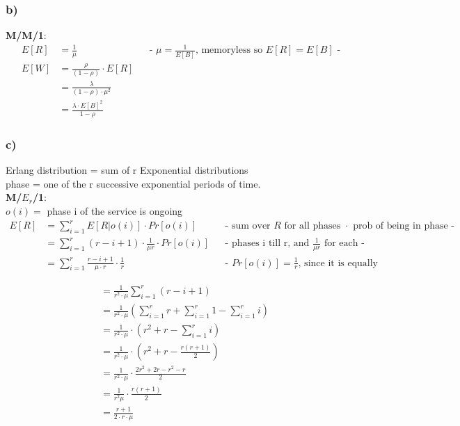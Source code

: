 \subsubsection*{ b) }

\textbf{M/M/1}:
\begin{align*}
E\left[R\right]&=\frac{1}{\mu }&& \text{-  $\mu = \frac{1}{E[B]}$, memoryless so $E\left[R\right]=E\left[B\right]$ -}\\
E\left[W\right]&=\frac{\rho }{\left(1-\rho \right)} \cdot E[R]\\
&= \frac{\lambda }{\left(1-\rho \right) \cdot \mu^2}\\
&=\frac{\lambda \cdot E\left[B\right]^{2}}{1-\rho }
\end{align*}

\subsubsection*{ c) }
Erlang distribution = sum of r Exponential distributions\\
phase = one of the r successive exponential periods of time.\\
\textbf{M/$E_r$/1}:\\
$o\left(i\right)=$ phase i of the service is ongoing
\begin{align*}
E\left[R\right]&=\sum _{{i=1}}^{r}E\left[R|o\left(i\right)\right]\cdot Pr\left[o\left(i\right)\right] &&
\text{- sum over $R$ for all phases $\cdot$ prob of being in phase -}\\
&=\sum _{{i=1}}^{r} (r-i+1) \cdot \frac{1}{\mu r} \cdot Pr\left[o\left(i\right)\right] &&
\text{- phases i till r, and $\frac{1}{\mu r}$ for each -}\\
&=\sum _{{i=1}}^{r}\frac{r-i+1}{\mu \cdot r}\cdot \frac{1}{r} &&
\text{- $Pr\left[o\left(i\right)\right]=\frac{1}{r}$, since it is equally distributed -}
\end{align*}

\begin{align*}
&=\frac{1}{r^{2}\cdot \mu }\sum _{i=1}^{r}\left(r-i+1\right)\\
&=\frac{1}{r^{2}\cdot \mu }\left(\sum_{i=1}^{r} r + \sum_{i=1}^{r} 1 - \sum_{i=1}^{r} i\right)\\
&=\frac{1}{r^{2}\cdot \mu }\cdot \left(r^{2}+r-\sum _{{i=1}}^{r}i\right)\\
&=\frac{1}{r^{2}\cdot \mu }\cdot \left(r^{2}+r-\frac{r\left(r+1\right)}{2}\right)\\
&=\frac{1}{r^{2}\cdot \mu }\cdot \frac{2r^{2}+2r-r^{2}-r}{2}\\
&=\frac{1}{r^{2}\mu }\cdot \frac{r(r+1)}{2}\\
&=\frac{r+1}{2\cdot r\cdot \mu }
\end{align*}

